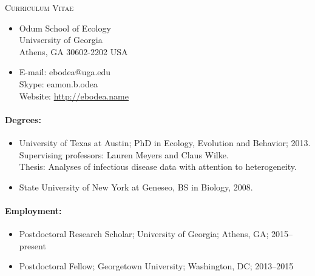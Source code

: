 \documentclass[a4paper]{article}
\begin{document}
\begin{center}
\textsc{Curriculum Vitae}
\end{center}

\begin{multicols}{2}
  \begin{itemize}
  \item[~] Odum School of Ecology\\Univsersity of Georgia\\Athens, GA 30602-2202 USA    
  \item[~] E-mail: ebodea@uga.edu\\Skype: eamon.b.odea\\Website: \url{http://ebodea.name}
\end{itemize}
\end{multicols}

\paragraph{Degrees:}
\begin{itemize}
  \item[~] University of Texas at Austin; PhD in Ecology, Evolution and Behavior; 2013. \\
    Supervising professors: Lauren Meyers and Claus Wilke.\\
    Thesis: Analyses of infectious disease data with attention
    to heterogeneity.
  \item[~] State University of New York at Geneseo, BS in Biology, 2008.
\end{itemize} 

\paragraph{Employment:}
\begin{itemize}
  \item[~] Postdoctoral Research Scholar; University of Georgia;
    Athens, GA; 2015--present
  \item[~] Postdoctoral Fellow; Georgetown University; Washington, DC;
    2013--2015
\end{itemize}
\end{document}

